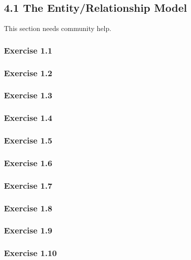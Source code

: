 \documentclass[../../main.tex]{subfiles}
\begin{document}
\subsection{4.1 The Entity/Relationship Model}

This section needs community help.

\subsubsection*{Exercise 1.1}

\subsubsection*{Exercise 1.2}

\subsubsection*{Exercise 1.3}

\subsubsection*{Exercise 1.4}

\subsubsection*{Exercise 1.5}

\subsubsection*{Exercise 1.6}

\subsubsection*{Exercise 1.7}

\subsubsection*{Exercise 1.8}

\subsubsection*{Exercise 1.9}

\subsubsection*{Exercise 1.10}
\end{document}
